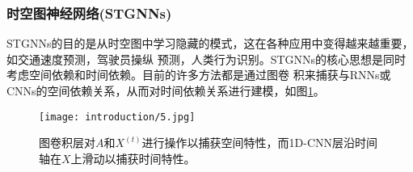 \subsubsection{时空图神经网络(STGNNs)}
STGNNs的目的是从时空图中学习隐藏的模式，这在各种应用中变得越来越重要，如交通速度预测，驾驶员操纵
预测，人类行为识别。STGNNs的核心思想是同时考虑空间依赖和时间依赖。目前的许多方法都是通过图卷
积来捕获与RNNs或CNNs的空间依赖关系，从而对时间依赖关系进行建模，如图\ref{1-5}。
\begin{figure}[htbp]
    \centering
    \captionsetup{width=10cm}
    \texttt{[image: introduction/5.jpg]}
    \caption{\label{1-5}图卷积层对$A$和$X^(t)$进行操作以捕获空间特性，而1D-CNN层沿时间轴在$X$上滑动以捕获时间特性。}
\end{figure}


